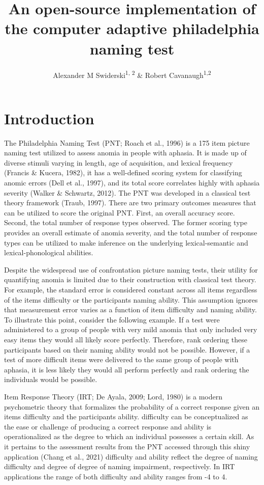 \documentclass[
  english,
  jou]{apa6}
\title{An open-source implementation of the computer adaptive philadelphia naming test}
\author{Alexander M Swiderski\textsuperscript{1, 2} \& Robert Cavanaugh\textsuperscript{1,2}}
\date{}
\affiliation{\vspace{0.5cm}\textsuperscript{1} University of Pittsburgh\\\textsuperscript{2} VA Pittsburgh Healthcare System}
\begin{document}
\maketitle

\hypertarget{introduction}{%
\section{Introduction}\label{introduction}}

The Philadelphia Naming Test (PNT; Roach et al., 1996) is a 175 item picture naming test utilized to assess anomia in people with aphasia. It is made up of diverse stimuli varying in length, age of acquisition, and lexical frequency (Francis \& Kucera, 1982), it has a well-defined scoring system for classifying anomic errors (Dell et al., 1997), and its total score correlates highly with aphasia severity (Walker \& Schwartz, 2012). The PNT was developed in a classical test theory framework (Traub, 1997). There are two primary outcomes measures that can be utilized to score the original PNT. First, an overall accuracy score. Second, the total number of response types observed. The former scoring type provides an overall estimate of anomia severity, and the total number of response types can be utilized to make inference on the underlying lexical-semantic and lexical-phonological abilities.

Despite the widespread use of confrontation picture naming tests, their utility for quantifying anomia is limited due to their construction with classical test theory. For example, the standard error is considered constant across all items regardless of the items difficulty or the participants naming ability. This assumption ignores that measurement error varies as a function of item difficulty and naming ability. To illustrate this point, consider the following example. If a test were administered to a group of people with very mild anomia that only included very easy items they would all likely score perfectly. Therefore, rank ordering these participants based on their naming ability would not be possible. However, if a test of more difficult items were delivered to the same group of people with aphasia, it is less likely they would all perform perfectly and rank ordering the individuals would be possible.

Item Response Theory (IRT; De Ayala, 2009; Lord, 1980) is a modern psychometric theory that formalizes the probability of a correct response given an items difficulty and the participants ability. difficulty can be conceptualized as the ease or challenge of producing a correct response and ability is operationalized as the degree to which an individual possesses a certain skill. As it pertains to the assessment results from the PNT accessed through this shiny application (Chang et al., 2021) difficulty and ability reflect the degree of naming difficulty and degree of degree of naming impairment, respectively. In IRT applications the range of both difficulty and ability ranges from -4 to 4.
\end{document}
